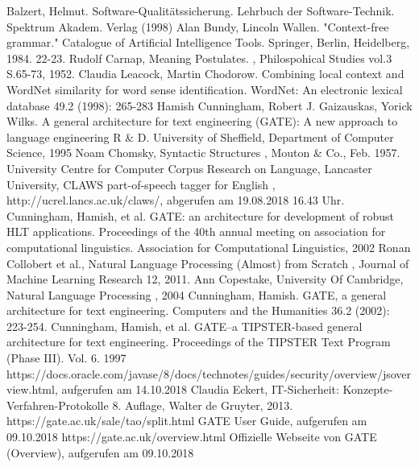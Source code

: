\documentclass[12pt]{report}
\begin{document}
\newpage
\begin{thebibliography}{20}

Balzert, Helmut. \glqq  Software-Qualitätssicherung.\grqq{}  Lehrbuch der Software-Technik. Spektrum Akadem. Verlag (1998)
 Alan Bundy, Lincoln Wallen. "Context-free grammar." Catalogue of Artificial Intelligence Tools. Springer, Berlin, Heidelberg, 1984. 22-23.
Rudolf Carnap, \glqq  Meaning Postulates.\grqq{} , Philospohical Studies vol.3 S.65-73, 1952.
Claudia Leacock, Martin Chodorow. \glqq   Combining local context and WordNet similarity for word sense identification.\grqq{}  WordNet: An electronic lexical database 49.2 (1998): 265-283
 Hamish Cunningham, Robert J. Gaizauskas, Yorick Wilks. A general architecture for text engineering (GATE): A new approach to language engineering R \& D. University of Sheffield, Department of Computer Science, 1995
 Noam Chomsky, \glqq  Syntactic Structures\grqq{} , Mouton \& Co., Feb. 1957.
University Centre for Computer Corpus Research on Language, Lancaster University, \glqq  CLAWS part-of-speech tagger for English\grqq{} , http://ucrel.lancs.ac.uk/claws/, abgerufen am 19.08.2018 16.43 Uhr.
 Cunningham, Hamish, et al. \glqq  GATE: an architecture for development of robust HLT applications.\grqq{}  Proceedings of the 40th annual meeting on association for computational linguistics. Association for Computational Linguistics, 2002
Ronan Collobert et al., \glqq  Natural Language Processing (Almost) from Scratch\grqq{} , Journal of Machine Learning Research 12, 2011. 
Ann Copestake, University Of Cambridge, \glqq  Natural Language Processing\grqq{} , 2004
Cunningham, Hamish. \glqq   GATE, a general architecture for text engineering.\grqq{}  Computers and the Humanities 36.2 (2002): 223-254.
Cunningham, Hamish, et al. \glqq   GATE–a TIPSTER-based general architecture for text engineering.\grqq{}  Proceedings of the TIPSTER Text Program (Phase III). Vol. 6. 1997
 https://docs.oracle.com/javase/8/docs/technotes/guides/security/overview/jsoverview.html, aufgerufen am 14.10.2018
Claudia Eckert, \glqq  IT-Sicherheit: Konzepte-Verfahren-Protokolle\grqq{}  8. Auflage, Walter de Gruyter, 2013.
 https://gate.ac.uk/sale/tao/split.html GATE User Guide, aufgerufen am 09.10.2018
 https://gate.ac.uk/overview.html Offizielle Webseite von GATE (Overview), aufgerufen am 09.10.2018

\end{thebibliography}
\end{document}
